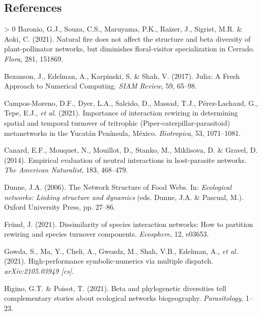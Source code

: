 \documentclass[11pt]{article}
\newlength{\cslhangindent}
\newenvironment{CSLReferences}[3] %
 {%
  \setlength{\parindent}{0pt}
  \ifodd #1 \everypar{\setlength{\hangindent}{\cslhangindent}}\ignorespaces\fi
  \ifnum #2 > 0
  \setlength{\parskip}{#2\baselineskip}
  \fi
 }%
 {}
\begin{document}
\hypertarget{references}{%
\subsection*{References}\label{references}}

\hypertarget{refs}{}
\begin{CSLReferences}{1}{0}
\leavevmode\hypertarget{ref-Baronio2021NatFir}{}%
Baronio, G.J., Souza, C.S., Maruyama, P.K., Raizer, J., Sigrist, M.R. \&
Aoki, C. (2021). Natural fire does not affect the structure and beta
diversity of plant-pollinator networks, but diminishes floral-visitor
specialization in Cerrado. \emph{Flora}, 281, 151869.

\leavevmode\hypertarget{ref-Bezanson2017JulFre}{}%
Bezanson, J., Edelman, A., Karpinski, S. \& Shah, V. (2017). Julia: A
Fresh Approach to Numerical Computing. \emph{SIAM Review}, 59, 65--98.

\leavevmode\hypertarget{ref-Campos-Moreno2021ImpInt}{}%
Campos-Moreno, D.F., Dyer, L.A., Salcido, D., Massad, T.J.,
Pérez-Lachaud, G., Tepe, E.J., \emph{et al.} (2021). Importance of
interaction rewiring in determining spatial and temporal turnover of
tritrophic (Piper-caterpillar-parasitoid) metanetworks in the Yucatán
Península, México. \emph{Biotropica}, 53, 1071--1081.

\leavevmode\hypertarget{ref-Canard2014EmpEva}{}%
Canard, E.F., Mouquet, N., Mouillot, D., Stanko, M., Miklisova, D. \&
Gravel, D. (2014). Empirical evaluation of neutral interactions in
host-parasite networks. \emph{The American Naturalist}, 183, 468--479.

\leavevmode\hypertarget{ref-Dunne2006NetStr}{}%
Dunne, J.A. (2006). The Network Structure of Food Webs. In:
\emph{Ecological networks: Linking structure and dynamics} (eds. Dunne,
J.A. \& Pascual, M.). Oxford University Press, pp. 27--86.

\leavevmode\hypertarget{ref-Frund2021DisSpe}{}%
Fründ, J. (2021). Dissimilarity of species interaction networks: How to
partition rewiring and species turnover components. \emph{Ecosphere},
12, e03653.

\leavevmode\hypertarget{ref-Gowda2021HigSym}{}%
Gowda, S., Ma, Y., Cheli, A., Gwozdz, M., Shah, V.B., Edelman, A.,
\emph{et al.} (2021). High-performance symbolic-numerics via multiple
dispatch. \emph{arXiv:2105.03949 {[}cs{]}}.

\leavevmode\hypertarget{ref-Higino2021BetPhy}{}%
Higino, G.T. \& Poisot, T. (2021). Beta and phylogenetic diversities
tell complementary stories about ecological networks biogeography.
\emph{Parasitology}, 1--23.


\end{CSLReferences}
\end{document}
